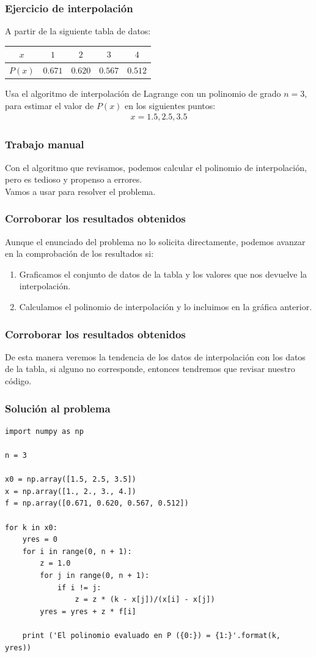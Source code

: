 \documentclass[12pt]{beamer}
\begin{document}
\begin{frame}
\frametitle{Ejercicio de interpolación}
A partir de la siguiente tabla de datos:
\pause
\begin{center}
\renewcommand{\arraystretch}{0.9}
\begin{tabular}{c | c | c | c | c}
$x$ & $1$ & $2$ & $3$ & $4$ \\ \hline
$P (x)$ & $0.671$ & $0.620$ & $0.567$ & $0.512$ \\
\end{tabular}
\end{center}
\pause
Usa el algoritmo de interpolación de Lagrange con un polinomio de grado $n = 3$, para estimar el valor de $P (x)$ en los siguientes puntos:
\begin{align*}
x = 1.5, 2.5, 3.5
\end{align*}
\end{frame}
\begin{frame}
\frametitle{Trabajo manual}
Con el algoritmo que revisamos, podemos calcular el polinomio de interpolación, pero es tedioso y propenso a errores.
\\
\bigskip
\pause
Vamos a usar \python{} para resolver el problema.
\end{frame}
\begin{frame}
\frametitle{Corroborar los resultados obtenidos}
Aunque el enunciado del problema no lo solicita directamente, podemos avanzar en la comprobación de los resultados si:
\begin{enumerate}[<+->]
\item Graficamos el conjunto de datos de la tabla y los valores que nos devuelve la interpolación.
\item Calculamos el polinomio de interpolación y lo incluimos en la gráfica anterior.
\end{enumerate}
\end{frame}
\begin{frame}
\frametitle{Corroborar los resultados obtenidos}
De esta manera veremos la tendencia de los datos de interpolación con los datos de la tabla, si alguno no corresponde, entonces tendremos que revisar nuestro código.
\end{frame}
\begin{frame}
\frametitle{Solución al problema}
\begin{lstlisting}[caption=Código para la interpolación de Lagrange]
import numpy as np

n = 3

x0 = np.array([1.5, 2.5, 3.5])
x = np.array([1., 2., 3., 4.])
f = np.array([0.671, 0.620, 0.567, 0.512])

for k in x0:
    yres = 0
    for i in range(0, n + 1):
        z = 1.0
        for j in range(0, n + 1):
            if i != j:
                z = z * (k - x[j])/(x[i] - x[j])
        yres = yres + z * f[i] 
    
    print ('El polinomio evaluado en P ({0:}) = {1:}'.format(k,  yres))
\end{lstlisting}
\end{frame}
\end{document}
